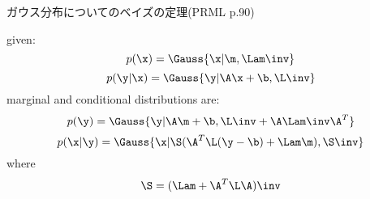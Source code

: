 

\begin{itembox}[l]{ガウス分布についてのベイズの定理(PRML p.90)}

given:
\[ p(\x) = \Gauss{\x | \m, \Lam\inv } \]
\[ p(\y|\x) = \Gauss{\y | \A\x + \b, \L\inv } \]
marginal and conditional distributions are:
\[ p(\y) = \Gauss{\y| \A\m + \b, \L\inv + \A \Lam\inv \A^T } \]
\[ p(\x|\y) = \Gauss{\x | \S (\A^T \L (\y - \b) + \Lam \m), \S\inv} \]
where
\[ \S = (\Lam + \A^T \L \A)\inv \]

\end{itembox}

